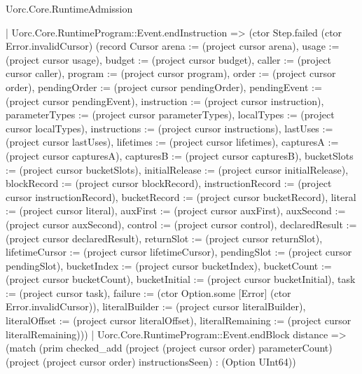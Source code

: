 \begin{lexlean}{Uorc.Core.RuntimeAdmission}
\begin{semanticmodule}
{          | Uorc.Core.RuntimeProgram::Event.endInstruction => (ctor Step.failed (ctor Error.invalidCursor) (record Cursor {arena := (project cursor arena), usage := (project cursor usage), budget := (project cursor budget), caller := (project cursor caller), program := (project cursor program), order := (project cursor order), pendingOrder := (project cursor pendingOrder), pendingEvent := (project cursor pendingEvent), instruction := (project cursor instruction), parameterTypes := (project cursor parameterTypes), localTypes := (project cursor localTypes), instructions := (project cursor instructions), lastUses := (project cursor lastUses), lifetimes := (project cursor lifetimes), capturesA := (project cursor capturesA), capturesB := (project cursor capturesB), bucketSlots := (project cursor bucketSlots), initialRelease := (project cursor initialRelease), blockRecord := (project cursor blockRecord), instructionRecord := (project cursor instructionRecord), bucketRecord := (project cursor bucketRecord), literal := (project cursor literal), auxFirst := (project cursor auxFirst), auxSecond := (project cursor auxSecond), control := (project cursor control), declaredResult := (project cursor declaredResult), returnSlot := (project cursor returnSlot), lifetimeCursor := (project cursor lifetimeCursor), pendingSlot := (project cursor pendingSlot), bucketIndex := (project cursor bucketIndex), bucketCount := (project cursor bucketCount), bucketInitial := (project cursor bucketInitial), task := (project cursor task), failure := (ctor Option.some [Error] (ctor Error.invalidCursor)), literalBuilder := (project cursor literalBuilder), literalOffset := (project cursor literalOffset), literalRemaining := (project cursor literalRemaining)}))
          | Uorc.Core.RuntimeProgram::Event.endBlock distance => (match (prim checked_add (project (project cursor order) parameterCount) (project (project cursor order) instructionsSeen) : (Option UInt64))
}
\end{semanticmodule}
\end{lexlean}
